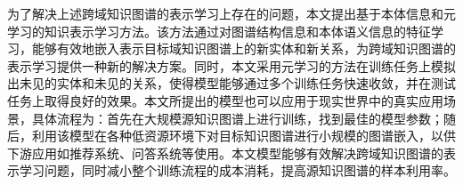 为了解决上述跨域知识图谱的表示学习上存在的问题，本文提出基于本体信息和元学习的知识表示学习方法。该方法通过对图谱结构信息和本体语义信息的特征学习，能够有效地嵌入表示目标域知识图谱上的新实体和新关系，为跨域知识图谱的表示学习提供一种新的解决方案。同时，本文采用元学习的方法在训练任务上模拟出未见的实体和未见的关系，使得模型能够通过多个训练任务快速收敛，并在测试任务上取得良好的效果。本文所提出的模型也可以应用于现实世界中的真实应用场景，具体流程为：首先在大规模源知识图谱上进行训练，找到最佳的模型参数；随后，利用该模型在各种低资源环境下对目标知识图谱进行小规模的图谱嵌入，以供下游应用如推荐系统、问答系统等使用。本文模型能够有效解决跨域知识图谱的表示学习问题，同时减小整个训练流程的成本消耗，提高源知识图谱的样本利用率。




